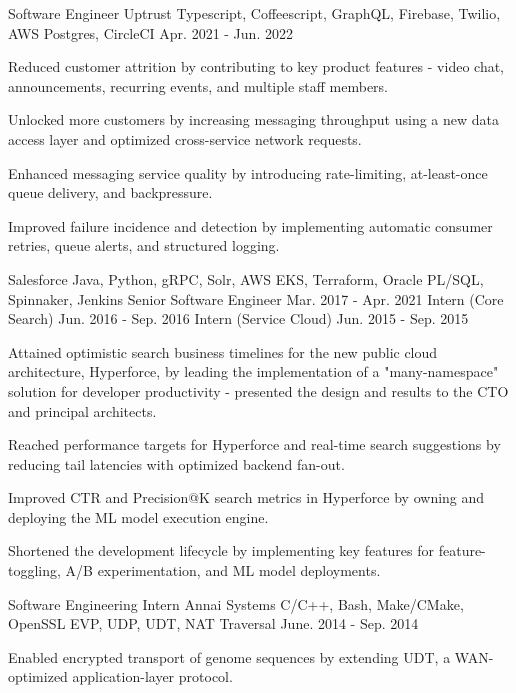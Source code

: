 
\begin{cventries}

  \cventry
    {Software Engineer}
    {Uptrust}
    {Typescript, Coffeescript, GraphQL, Firebase, Twilio, AWS Postgres, CircleCI}
    {Apr. 2021 - Jun. 2022}
    {
      \begin{cvitems}
        \item {Reduced customer attrition by contributing to key product features - video chat, announcements, recurring events, and multiple staff members.}
        \item {Unlocked more customers by increasing messaging throughput using a new data access layer and optimized cross-service network requests.}
        \item {Enhanced messaging service quality by introducing rate-limiting, at-least-once queue delivery, and backpressure.}
        \item {Improved failure incidence and detection by implementing automatic consumer retries, queue alerts, and structured logging.}
      \end{cvitems}
    }

  \cvthreeentry
    {Salesforce}
    {Java, Python, gRPC, Solr, AWS EKS, Terraform, Oracle PL/SQL, Spinnaker, Jenkins}
    {Senior Software Engineer}
    {Mar. 2017 - Apr. 2021}
    {Intern (Core Search)}
    {Jun. 2016 - Sep. 2016}
    {Intern (Service Cloud)}
    {Jun. 2015 - Sep. 2015}
    {
      \begin{cvitems}
        \item {Attained optimistic search business timelines for the new public cloud architecture, Hyperforce, by leading the implementation of a "many-namespace" solution for developer productivity - presented the design and results to the CTO and principal architects.}
        \item {Reached performance targets for Hyperforce and real-time search suggestions by reducing tail latencies with optimized backend fan-out.}
        \item {Improved CTR and Precision@K search metrics in Hyperforce by owning and deploying the ML model execution engine.}
        \item {Shortened the development lifecycle by implementing key features for feature-toggling, A/B experimentation, and ML model deployments.}
      \end{cvitems}
    }

  \cventry
    {Software Engineering Intern}
    {Annai Systems}
    {C/C++, Bash, Make/CMake, OpenSSL EVP, UDP, UDT, NAT Traversal}
    {June. 2014 - Sep. 2014}
    {
      \begin{cvitems}
        \item {Enabled encrypted transport of genome sequences by extending UDT, a WAN-optimized application-layer protocol.}
      \end{cvitems}
    }

\end{cventries}
